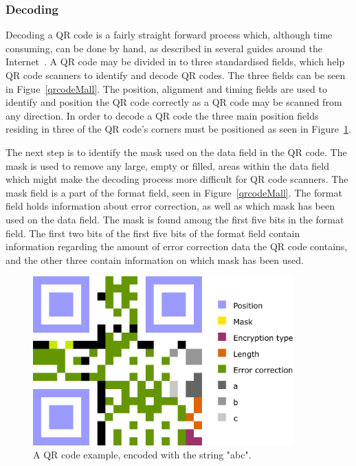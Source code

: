 \subsubsection{Decoding}
Decoding a QR code is a fairly straight forward process which, although time consuming, can be done by hand, as described in several guides around the Internet~\cite{qrcodeDecoding2, qrcodeDecoding, qrcodeDecoding3}. A QR code may be divided in to three standardised fields, which help QR code scanners to identify and decode QR codes. The three fields can be seen in Figue~\ref{qrcodeMall}. The position, alignment and timing fields are used to identify and position the QR code correctly as a QR code may be scanned from any direction. In order to decode a QR code the three main position fields residing in three of the QR code's corners must be positioned as seen in Figure~\ref{qrcodeExample}.

The next step is to identify the mask used on the data field in the QR code. The mask is used to remove any large, empty or filled, areas within the data field which might make the decoding process more difficult for QR code scanners. The mask field is a part of the format field, seen in Figure~\ref{qrcodeMall}. The format field holds information about error correction, as well as which mask has been used on the data field. The mask is found among the first five bits in the format field. The first two bits of the first five bits of the format field contain information regarding the amount of error correction data the QR code contains, and the other three contain information on which mask has been used.

	\begin{figure}[H]%
		\centering
		\includegraphics[width=100mm]{images/qrcodeexample}
		\caption{A QR code example, encoded with the string "abc".}
		\label{qrcodeExample}
	\end{figure}

